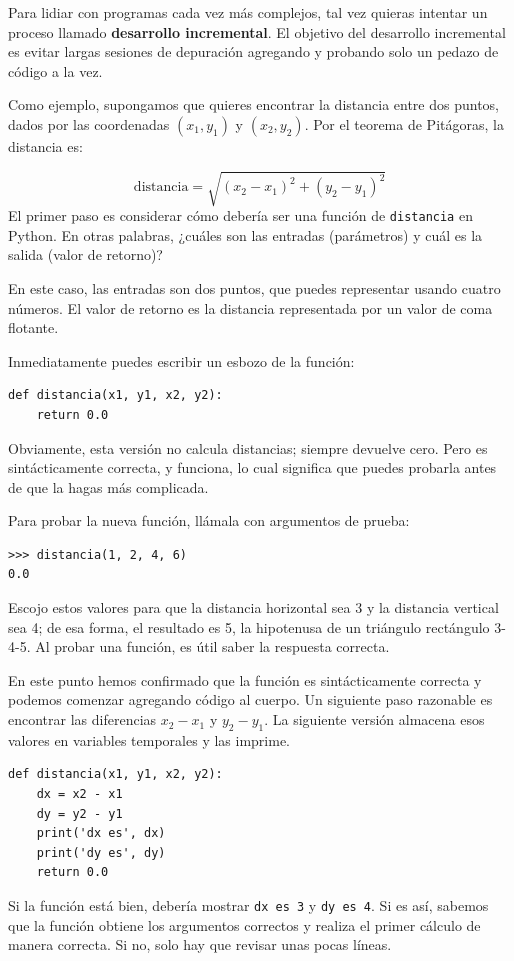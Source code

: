 \documentclass[10pt]{book}
\begin{document}
Para lidiar con programas cada vez más complejos,
tal vez quieras intentar un proceso llamado
{\bf desarrollo incremental}.  El objetivo del desarrollo incremental
es evitar largas sesiones de depuración agregando y probando solo
un pedazo de código a la vez.

Como ejemplo, supongamos que quieres encontrar la distancia entre dos
puntos, dados por las coordenadas $(x_1, y_1)$ y $(x_2, y_2)$.
Por el teorema de Pitágoras, la distancia es:

\begin{displaymath}
\mathrm{distancia} = \sqrt{(x_2 - x_1)^2 + (y_2 - y_1)^2}
\end{displaymath}
%
El primer paso es considerar cómo debería ser una función de {\tt distancia}
en Python.  En otras palabras, ¿cuáles son las entradas (parámetros)
y cuál es la salida (valor de retorno)?

En este caso, las entradas son dos puntos, que puedes representar
usando cuatro números.  El valor de retorno es la distancia representada por
un valor de coma flotante.

Inmediatamente puedes escribir un esbozo de la función:

\begin{verbatim}
def distancia(x1, y1, x2, y2):
    return 0.0
\end{verbatim}
%
Obviamente, esta versión no calcula distancias; siempre devuelve
cero.  Pero es sintácticamente correcta, y funciona, lo cual significa que
puedes probarla antes de que la hagas más complicada.

Para probar la nueva función, llámala con argumentos de prueba:

\begin{verbatim}
>>> distancia(1, 2, 4, 6)
0.0
\end{verbatim}
%
Escojo estos valores para que la distancia horizontal sea 3 y la
distancia vertical sea 4; de esa forma, el resultado es 5, la hipotenusa
de un triángulo rectángulo 3-4-5. Al probar una función, es
útil saber la respuesta correcta.

En este punto hemos confirmado que la función es sintácticamente
correcta y podemos comenzar agregando código al cuerpo.
Un siguiente paso razonable es encontrar las diferencias
$x_2 - x_1$ y $y_2 - y_1$.  La siguiente versión almacena esos valores en
variables temporales y las imprime.

\begin{verbatim}
def distancia(x1, y1, x2, y2):
    dx = x2 - x1
    dy = y2 - y1
    print('dx es', dx)
    print('dy es', dy)
    return 0.0
\end{verbatim}
%
Si la función está bien, debería mostrar \verb"dx es 3" y
\verb"dy es 4".  Si es así, sabemos que la función obtiene los argumentos
correctos y realiza el primer cálculo de manera correcta.  Si no,
solo hay que revisar unas pocas líneas.
\end{document}
